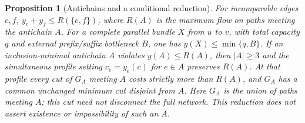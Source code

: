 \documentclass[11pt]{article}
\newtheorem{proposition}[theorem]{Proposition}
\theoremstyle{definition}\newtheorem{definition}[theorem]{Definition}
\theoremstyle{remark}\newtheorem{remark}[theorem]{Remark}
\begin{document}
\begin{proposition}[Antichains and a conditional reduction]\label{noise:antichain}
For incomparable edges $e,f$, $y_e+y_f\le R(\{e,f\})$, where $R(A)$ is
the maximum flow on paths meeting the antichain $A$. For a complete parallel
bundle $X$ from $u$ to $v$, with total capacity $q$ and external prefix/suffix
bottleneck $B$, one has $y(X)\le\min\{q,B\}$.
If an inclusion-minimal antichain $A$ violates $y(A)\le R(A)$, then
$|A|\ge3$ and the simultaneous profile setting $c_e=y_e(c)$ for $e\in A$
preserves $R(A)$. At that profile every cut of $G_A$ meeting $A$ costs
strictly more than $R(A)$, and $G_A$ has a common unchanged minimum cut
disjoint from $A$. Here $G_A$ is the union of paths meeting $A$; this cut
need not disconnect the full network.
This reduction does not assert existence or impossibility of such an $A$.
\end{proposition}
\end{document}
